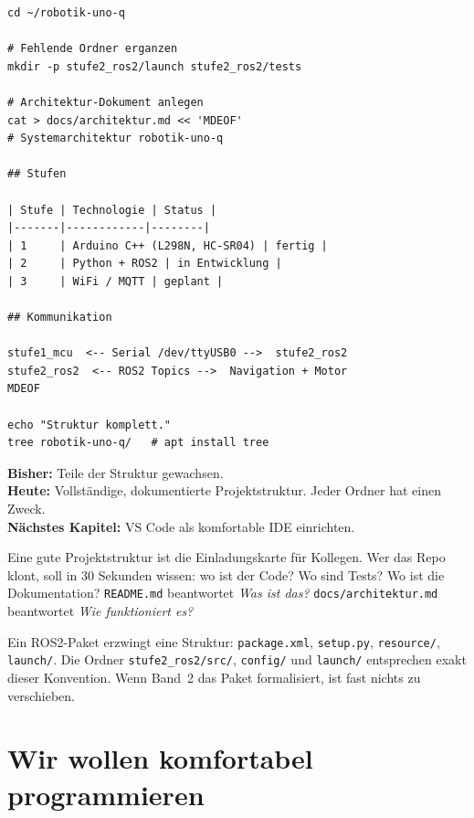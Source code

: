 \begin{loesungBox}
\begin{lstlisting}[style=bash]
cd ~/robotik-uno-q

# Fehlende Ordner erganzen
mkdir -p stufe2_ros2/launch stufe2_ros2/tests

# Architektur-Dokument anlegen
cat > docs/architektur.md << 'MDEOF'
# Systemarchitektur robotik-uno-q

## Stufen

| Stufe | Technologie | Status |
|-------|------------|--------|
| 1     | Arduino C++ (L298N, HC-SR04) | fertig |
| 2     | Python + ROS2 | in Entwicklung |
| 3     | WiFi / MQTT | geplant |

## Kommunikation

stufe1_mcu  <-- Serial /dev/ttyUSB0 -->  stufe2_ros2
stufe2_ros2  <-- ROS2 Topics -->  Navigation + Motor
MDEOF

echo "Struktur komplett."
tree robotik-uno-q/   # apt install tree
\end{lstlisting}
\end{loesungBox}

\begin{projektBox}
\textbf{Bisher:} Teile der Struktur gewachsen.\\
\textbf{Heute:} Vollständige, dokumentierte Projektstruktur.
Jeder Ordner hat einen Zweck.\\
\textbf{Nächstes Kapitel:} VS Code als komfortable IDE einrichten.
\end{projektBox}

\begin{merksatzBox}
Eine gute Projektstruktur ist die Einladungskarte für Kollegen.
Wer das Repo klont, soll in 30 Sekunden wissen: wo ist der Code?
Wo sind Tests? Wo ist die Dokumentation?
\texttt{README.md} beantwortet \emph{Was ist das?}
\texttt{docs/architektur.md} beantwortet \emph{Wie funktioniert es?}
\end{merksatzBox}

\begin{robotikBox}
Ein ROS2-Paket erzwingt eine Struktur: \texttt{package.xml},
\texttt{setup.py}, \texttt{resource/}, \texttt{launch/}.
Die Ordner \texttt{stufe2\_ros2/src/}, \texttt{config/} und
\texttt{launch/} entsprechen exakt dieser Konvention.
Wenn Band~2 das Paket formalisiert, ist fast nichts zu verschieben.
\end{robotikBox}

\chapter{Wir wollen komfortabel programmieren}

